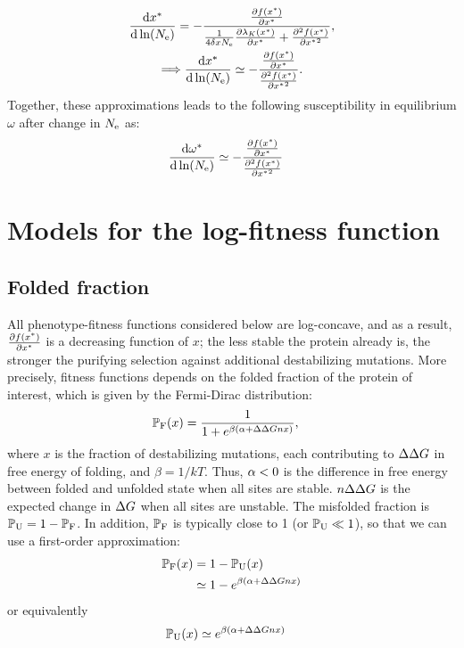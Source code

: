 \begin{gather}
\frac{ \mathrm{d} x^{*}}{\mathrm{d} \ln (N_{\mathrm{e}})}  = - \frac{\frac{ \partial f (x^{*}) }{\partial {x^{*}}}}{\frac{1}{4 \delta x N_{\mathrm{e}}} \frac{\partial \lambda_K (x^{*}) }{\partial x^{*} } + \frac{ \partial^2 f (x^{*}) }{\partial {x^{*}}^2}},\\
\Longrightarrow \frac{ \mathrm{d} x^{*}}{\mathrm{d} \ln (N_{\mathrm{e}})}  \simeq - \frac{\frac{ \partial f (x^{*}) }{\partial {x^{*}}}}{\frac{ \partial^2 f (x^{*}) }{\partial {x^{*}}^2}}. \label{eq:approx_dx_dlnNe}
\end{gather}
Together, these approximations leads to the following susceptibility in equilibrium $\omega$ after change in $N_{\mathrm{e}}$ as:
\begin{align}
\frac{ \mathrm{d} \omega^{*}}{\mathrm{d} \ln (N_{\mathrm{e}})} & \simeq - \frac{\frac{ \partial f (x^{*}) }{\partial {x^{*}}}}{\frac{ \partial^2 f (x^{*}) }{\partial {x^{*}}^2}}
\label{eq:approx_dw_dlnNe}
\end{align}

\section{Models for the log-fitness function}
\label{sec:models-for-the-log-fitness-function}

\subsection{Folded fraction}
\label{subsec:folded-fraction}

All phenotype-fitness functions considered below are log-concave, and as a result, $\frac{ \partial f (x^{*}) }{\partial {x^{*}}}$ is a decreasing function of $x$; the less stable the protein already is, the stronger the purifying selection against additional destabilizing mutations. More precisely, fitness functions depends on the folded fraction of the protein of interest, which is given by the Fermi-Dirac distribution:
\begin{align}
\mathbb{P}_{\textrm{F}} (x) & = \frac{1}{1 + e^{\beta(\alpha + \Delta \Delta G n x)}},
\end{align}
where $x$ is the fraction of destabilizing mutations, each contributing to $\Delta \Delta G$ in free energy of folding, and $\beta = 1 / kT$.
Thus, $\alpha < 0$ is the difference in free energy between folded and unfolded state when all sites are stable. $n \Delta \Delta G$ is the expected change in $\Delta G$ when all sites are unstable.
The misfolded fraction is  $\mathbb{P}_{\textrm{U}} = 1-\mathbb{P}_{\textrm{F}}$.
In addition, $\mathbb{P}_{\textrm{F}}$ is typically close to 1 (or $\mathbb{P}_{\textrm{U}} \ll 1$), so that we can use a first-order approximation:
\begin{align}
\mathbb{P}_{\textrm{F}}(x) & = 1 - \mathbb{P}_{\textrm{U}}(x) \\
& \simeq 1 - e^{\beta(\alpha + \Delta \Delta G n x)}
\end{align}
or equivalently
\begin{align}
\mathbb{P}_{\textrm{U}}(x) & \simeq e^{\beta(\alpha + \Delta \Delta G n x)}
\end{align}

